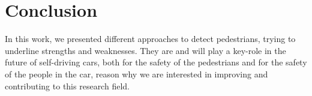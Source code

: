 \documentclass[10pt,journal,compsoc]{IEEEtran}
\begin{document}
%






\section{Conclusion}
In this work, we presented different approaches to detect pedestrians, trying to
underline strengths and weaknesses. They are and will play a key-role in the future
of self-driving cars, both for the safety of the pedestrians and for the safety
of the people in the car, reason why we are interested in improving and contributing
to this research field.
\end{document}
